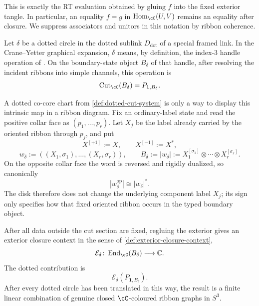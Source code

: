 \begin{remark}
\label{rem:exterior-closure-meaning}
This is exactly the RT evaluation obtained by gluing $f$ into the fixed
exterior tangle.  In particular, an equality $f=g$ in
$\operatorname{Hom}_{\cC}(U,V)$ remains an equality after closure.  We
suppress associators and unitors in this notation by ribbon coherence.
\end{remark}

\begin{definition}
\label{def:dotted-circle-translation}
Let $\delta$ be a dotted circle in the dotted sublink
$D_{\mathrm{dot}}$ of a special framed link.  In the Crane--Yetter
graphical expansion, $\delta$ means, by definition, the index-$3$ handle
operation of \cite[Definition~5.11, $k=3$]{Tham2021}.  On the boundary-state
object $B_\delta$ of that handle, after resolving the incident ribbons into
simple channels, this operation is
\[
  \operatorname{Cut}_{\cC}(B_\delta)=P_{\mathbf1,B_\delta}.
\]

A dotted co-core chart from \cref{def:dotted-cut-system} is only a way to
display this intrinsic map in a ribbon diagram.  Fix an ordinary-label state
and read the positive collar face as $(p_1,\ldots,p_r)$.  Let $X_j$ be the
label already carried by the oriented ribbon through $p_j$, and put
\[
  X^{[+1]}:=X,\qquad X^{[-1]}:=X^*,
\]
\[
  w_\delta:=((X_1,\sigma_1),\ldots,(X_r,\sigma_r)),
  \qquad
  B_\delta:=|w_\delta|
  :=X_1^{[\sigma_1]}\otimes\cdots\otimes X_r^{[\sigma_r]}.
\]
On the opposite collar face the word is reversed and rigidly dualized, so
canonically
\[
  |w_\delta^{\mathrm{op}}|\cong |w_\delta|^*.
\]
The disk therefore does not change the underlying component label $X_j$;
its sign only specifies how that fixed oriented ribbon occurs in the typed
boundary object.

After all data outside the cut section are fixed, regluing the exterior gives
an exterior closure context in the sense of
\cref{def:exterior-closure-context},
\[
  \mathcal E_\delta\colon
  \operatorname{End}_{\cC}(B_\delta)\longrightarrow\mathbb C.
\]
The dotted contribution is
\[
  \mathcal E_\delta(P_{\mathbf1,B_\delta}).
  \tag{3.1}\label{eq:intrinsic-dotted-context}
\]
After every dotted circle has been translated in this way, the result is a
finite linear combination of genuine closed $\cC$-coloured ribbon graphs in
$S^3$.
\end{definition}


